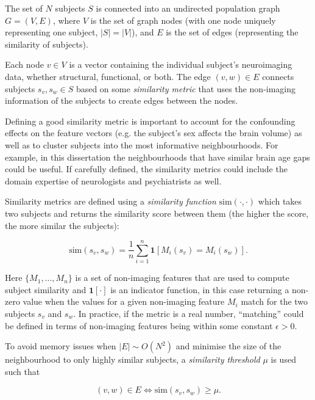 The set of $N$ subjects $S$ is connected into an undirected population graph $G = (V, E)$, where $V$ is the set of graph nodes (with one node uniquely representing one subject, $|S| = |V|$), and $E$ is the set of edges (representing the similarity of subjects).

Each node $v \in V$ is a vector containing the individual subject's neuroimaging data, whether structural, functional, or both. The edge $(v, w) \in E$ connects subjects $s_v, s_w \in S$ based on some \textit{similarity metric} that uses the non-imaging information of the subjects to create edges between the nodes. 

Defining a good similarity metric is important to account for the confounding effects on the feature vectors (e.g. the subject's sex affects the brain volume) as well as to cluster subjects into the most informative neighbourhoods. For example, in this dissertation the neighbourhoods that have similar brain age gaps could be useful. If carefully defined, the similarity metrics could include the domain expertise of neurologists and psychiatrists as well.

Similarity metrics are defined using a \textit{similarity function} $\mathrm{sim}(\cdot, \cdot)$ which takes two subjects and returns the similarity score between them (the higher the score, the more similar the subjects):

\begin{equation}
    \mathrm{sim}(s_v, s_w) = \frac{1}{n}\sum_{i=1}^{n} \mathbf{1}[M_i(s_v) = M_i(s_w)].
    \label{eq:similarity}
\end{equation}

Here $\{M_1, \dots, M_n\}$ is a set of non-imaging features that are used to compute subject similarity and $\mathbf{1}[\cdot]$ is an indicator function, in this case returning a non-zero value when the values for a given non-imaging feature $M_i$ match for the two subjects $s_v$ and $s_w$. In practice, if the metric is a real number, ``matching'' could be defined in terms of non-imaging features being within some constant $\epsilon > 0$. 

To avoid memory issues when $|E| \sim O(N^2)$ and minimise the size of the neighbourhood to only highly similar subjects, a \textit{similarity threshold} $\mu$ is used such that

\begin{equation}
    (v, w) \in E \iff \mathrm{sim}(s_v, s_w) \geq \mu.
    \label{eq:similarity-threshold}
\end{equation}

